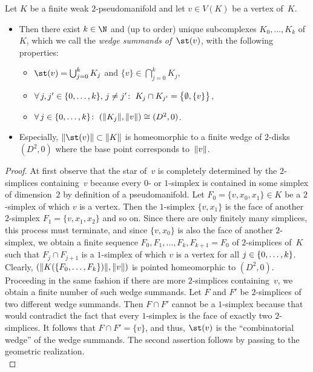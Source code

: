 \begin{thProposition}
    \label{ch4:starinpmfd}
    Let $K$ be a finite weak $2$-pseudo\-manifold and let $v\in V(K)$ be a vertex
    of~$K$.
    \begin{itemize}
        \item
            Then there exist $k\in\N$ and (up to order) unique subcomplexes
            $K_0,\dots,K_k$ of~$K$, which we call the \emph{wedge summands
            of~$\st(v)$}, with the following properties:
            \begin{itemize}[labelsep=3mm,leftmargin=!]
                \item
                    $\st(v) = \bigcup_{j=0}^k K_j$
                    and $\{v\} \in \bigcap_{j=0}^k K_j$,
                \item
                    $\forall\,j,j'\in\{0,\ldots,k\},\,j\neq j'\colon\;
                    K_j\cap K_{j'} = \bigl\{\emptyset, \{v\}\bigr\}$,
                \item
                    $\forall\,j\in\{0,\ldots,k\}\colon\;
                    (\lVert K_j\rVert,\lVert v\rVert) \cong (D^2,0)$.
            \end{itemize}
            
        \item
            Especially, $\geom{\st(v)}\subset\geom{K}$ is homeomorphic to a
            finite wedge of $2$-disks~$(D^2,0)$ where the base point corresponds
            to~$\lVert v\rVert$.
    \end{itemize}
\end{thProposition}

\begin{proof}
    At first observe that the star of~$v$ is completely determined by the
    $2$-sim\-plices containing~$v$ because every $0$- or $1$-simplex is
    contained in some simplex of dimension~$2$ by definition of a
    pseudomanifold.  Let $F_0=\{v,x_0,x_1\}\in K$ be a
    $2$-simplex of which $v$ is a vertex. Then the $1$-simplex
    $\{v,x_1\}$ is the face of another $2$-simplex $F_1=\{v,x_1,x_2\}$
    and so on. Since there are only finitely many simplices, this process
    must terminate, and since $\{v,x_0\}$ is also the face of another
    $2$-simplex, we obtain a finite sequence $F_0,F_1,\dots,F_k,F_{k+1}=F_0$
    of $2$-simplices of~$K$ such that $F_j\cap F_{j+1}$ is a $1$-simplex
    of which $v$ is a vertex for all $j\in\{0,\ldots,k\}$. %
    Clearly, $(\lVert K(\{F_0,\dots,F_k\})\rVert,\lVert v\rVert)$ is pointed
    homeomorphic to $(D^2,0)$. Proceeding in the same fashion if there are more
    $2$-simplices containing~$v$, we obtain a finite number of such wedge
    summands.
    Let $F$ and $F'$ be $2$-simplices of two different wedge summands.
    Then $F\cap F'$ cannot be a $1$-simplex because that would contradict
    the fact that every $1$-simplex is the face of exactly two $2$-simplices.
    It follows that $F\cap F' = \{v\}$, and thus, $\st(v)$ is the
    \enquote{combinatorial wedge} of the wedge summands. The second assertion
    follows by passing to the geometric realization.
    \\
\end{proof}

